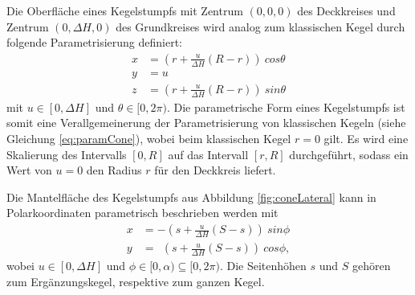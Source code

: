 Die Oberfläche eines Kegelstumpfs mit Zentrum $(0,0,0)$ des Deckkreises und Zentrum $(0,\Delta H, 0)$ des Grundkreises wird analog zum klassischen Kegel durch folgende Parametrisierung definiert:
\begin{equation} \label{eq:paramFrustum}
\begin{aligned}
x &= (r + \frac{u}{\Delta H} (R - r))~cos \theta \\
y &= u \\
z &= (r + \frac{u}{\Delta H} (R - r))~sin \theta
\end{aligned}
\end{equation}
mit $u\in [0, \Delta H]$ und $\theta \in [0, 2\pi)$. Die parametrische Form eines Kegelstumpfs ist somit eine Verallgemeinerung der Parametrisierung von klassischen Kegeln (siehe Gleichung \ref{eq:paramCone}), wobei beim klassischen Kegel $r = 0$ gilt. Es wird eine Skalierung des Intervalls $[0, R]$ auf das Intervall $[r, R]$ durchgeführt, sodass ein Wert von $u = 0$ den Radius $r$ für den Deckkreis liefert.

Die Mantelfläche des Kegelstumpfs aus Abbildung \ref{fig:coneLateral} kann in Polarkoordinaten parametrisch beschrieben werden mit
\begin{equation} \label{eq:paramLateral}
\begin{aligned}
x &= -(s + \frac{u}{\Delta H}(S-s)) ~sin \phi \\
y &= ~~(s + \frac{u}{\Delta H} (S-s)) ~cos \phi,
\end{aligned}
\end{equation}
wobei  $u\in [0, \Delta H]$ und $\phi \in [0, \alpha) \subseteq [0, 2\pi)$. Die Seitenhöhen $s$ und $S$ gehören zum Ergänzungskegel, respektive zum ganzen Kegel.

